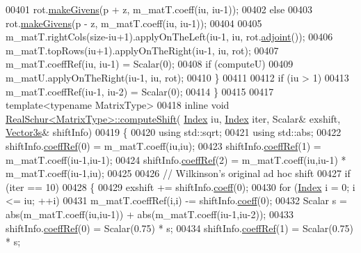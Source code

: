 \begin{DoxyCode}
00401       rot.\hyperlink{group___jacobi___module_af73c81e9cc139b7e0d877ce553b02ec0}{makeGivens}(p + z, m\_matT.coeff(iu, iu-1));
00402     \textcolor{keywordflow}{else}
00403       rot.\hyperlink{group___jacobi___module_af73c81e9cc139b7e0d877ce553b02ec0}{makeGivens}(p - z, m\_matT.coeff(iu, iu-1));
00404 
00405     m\_matT.rightCols(size-iu+1).applyOnTheLeft(iu-1, iu, rot.\hyperlink{group___jacobi___module_a89c8ea615f8fa77ddd5810a1e5fde4da}{adjoint}());
00406     m\_matT.topRows(iu+1).applyOnTheRight(iu-1, iu, rot);
00407     m\_matT.coeffRef(iu, iu-1) = Scalar(0); 
00408     \textcolor{keywordflow}{if} (computeU)
00409       m\_matU.applyOnTheRight(iu-1, iu, rot);
00410   \}
00411 
00412   \textcolor{keywordflow}{if} (iu > 1) 
00413     m\_matT.coeffRef(iu-1, iu-2) = Scalar(0);
00414 \}
00415 
00417 \textcolor{keyword}{template}<\textcolor{keyword}{typename} MatrixType>
00418 \textcolor{keyword}{inline} \textcolor{keywordtype}{void} \hyperlink{group___eigenvalues___module_class_eigen_1_1_real_schur}{RealSchur<MatrixType>::computeShift}(
      \hyperlink{group___eigenvalues___module_a8bd4653e2d9569a44ecc95e746422d3f}{Index} iu, \hyperlink{group___eigenvalues___module_a8bd4653e2d9569a44ecc95e746422d3f}{Index} iter, Scalar& exshift, \hyperlink{group___core___module}{Vector3s}& shiftInfo)
00419 \{
00420   \textcolor{keyword}{using} std::sqrt;
00421   \textcolor{keyword}{using} std::abs;
00422   shiftInfo.\hyperlink{class_eigen_1_1_plain_object_base_a25626a55b26a4323565f79d1b7c48ea8}{coeffRef}(0) = m\_matT.coeff(iu,iu);
00423   shiftInfo.\hyperlink{class_eigen_1_1_plain_object_base_a25626a55b26a4323565f79d1b7c48ea8}{coeffRef}(1) = m\_matT.coeff(iu-1,iu-1);
00424   shiftInfo.\hyperlink{class_eigen_1_1_plain_object_base_a25626a55b26a4323565f79d1b7c48ea8}{coeffRef}(2) = m\_matT.coeff(iu,iu-1) * m\_matT.coeff(iu-1,iu);
00425 
00426   \textcolor{comment}{// Wilkinson's original ad hoc shift}
00427   \textcolor{keywordflow}{if} (iter == 10)
00428   \{
00429     exshift += shiftInfo.\hyperlink{class_eigen_1_1_plain_object_base_afbfc12954f16d21aedb7bd839f64a278}{coeff}(0);
00430     \textcolor{keywordflow}{for} (\hyperlink{group___eigenvalues___module_a8bd4653e2d9569a44ecc95e746422d3f}{Index} i = 0; i <= iu; ++i)
00431       m\_matT.coeffRef(i,i) -= shiftInfo.\hyperlink{class_eigen_1_1_plain_object_base_afbfc12954f16d21aedb7bd839f64a278}{coeff}(0);
00432     Scalar s = abs(m\_matT.coeff(iu,iu-1)) + abs(m\_matT.coeff(iu-1,iu-2));
00433     shiftInfo.\hyperlink{class_eigen_1_1_plain_object_base_a25626a55b26a4323565f79d1b7c48ea8}{coeffRef}(0) = Scalar(0.75) * s;
00434     shiftInfo.\hyperlink{class_eigen_1_1_plain_object_base_a25626a55b26a4323565f79d1b7c48ea8}{coeffRef}(1) = Scalar(0.75) * s;

\end{DoxyCode}

